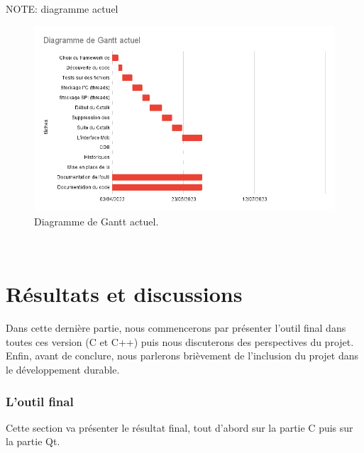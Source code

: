 \documentclass[a4paper]{article}
\begin{document}
NOTE: diagramme actuel

\begin{figure}[h!]
  \begin{center}
  \includegraphics[scale=0.6]{./img/current-gantt.png}
  \caption{Diagramme de Gantt actuel.}
    \label{fig:finalgantt}
  \end{center}
\end{figure}~\\
\clearpage
\part{Résultats et discussions}

Dans cette dernière partie, nous commencerons par présenter l'outil final dans
toutes ces version (C et C++) puis nous discuterons des perspectives du projet.
Enfin, avant de conclure, nous parlerons brièvement de l'inclusion du projet
dans le développement durable.

\section{L'outil final}

Cette section va présenter le résultat final, tout d'abord sur la partie C puis
sur la partie Qt.\\
\end{document}

